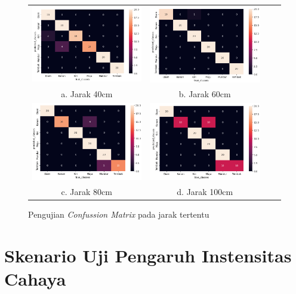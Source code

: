\begin{figure}[H]
    \begin{tabular}{cccc}
      \includegraphics[width=0.4\linewidth]{../Gambar/cm30.png} & \includegraphics[width=0.4\linewidth]{../Gambar/cm50.png} \\
      a. Jarak 40cm & b. Jarak 60cm \\ 
      \includegraphics[width=0.4\linewidth]{../Gambar/cm80.png} & \includegraphics[width=0.4\linewidth]{../Gambar/cm100.png} \\
      c. Jarak 80cm & d. Jarak 100cm
    \end{tabular}
    \centering
    \caption{Pengujian \emph{Confussion Matrix} pada jarak tertentu}
    \label{fig:cmsudut}
\end{figure}

\section{Skenario Uji Pengaruh Instensitas Cahaya}


